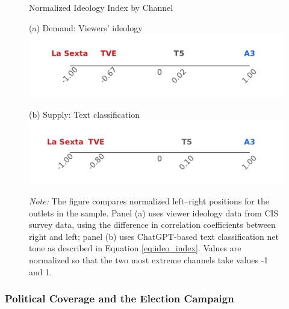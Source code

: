 \documentclass[12pt]{article}
\begin{document}
	
	
		\begin{figure}[!htbp]
		\centering
		\caption{Normalized Ideology Index by Channel}

		\begin{minipage}[t]{0.49\textwidth}
			\centering
					(a) Demand: Viewers' ideology
		\includegraphics[width=\linewidth]{figures/congress_line_cis}
		\end{minipage}
		\hfill
		\begin{minipage}[t]{0.49\textwidth}
			\centering

			
				(b) Supply: Text classification
			\includegraphics[width=\linewidth]{figures/congress_line_chatgpt}
			
			
		\end{minipage}
		
		
		\caption*{\small \textit{Note:} The figure compares normalized left–right positions for the outlets in the sample. Panel (a) uses viewer ideology data from CIS survey data, using the difference in correlation coefficients between right and left; panel (b) uses ChatGPT-based text classification net tone as described in Equation \ref{eq:ideo_index}. Values are normalized so that the two most extreme channels take values -1 and 1. }
		\label{fig:channel_ideology_lines}
	\end{figure}
	
	

	
	
		\subsubsection*{Political Coverage and the Election Campaign}
		
		
		
\end{document}
